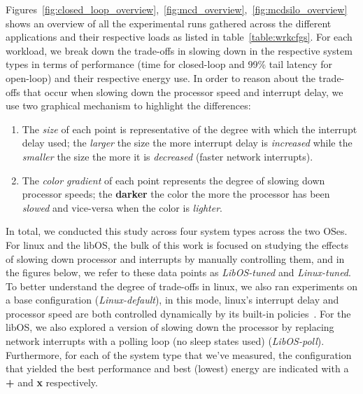\label{sec:exp}
Figures~\ref{fig:closed_loop_overview},~\ref{fig:mcd_overview},~\ref{fig:mcdsilo_overview} shows an overview of all the experimental runs gathered across the different applications and their respective loads as listed in table~\ref{table:wrkcfgs}. For each workload, we break down the trade-offs in slowing down in the respective system types in terms of performance (time for closed-loop and 99\% tail latency for open-loop) and their respective energy use. In order to reason about the trade-offs that occur when slowing down the processor speed and interrupt delay, we use two graphical mechanism to highlight the differences: 
\begin{enumerate}
    \item The \textit{size} of each point is representative of the degree with which the interrupt delay used; the {\larger[1]\textit{larger}} the size the more interrupt delay is \textit{increased} while the \textit{smaller} the size the more it is \textit{decreased} (faster network interrupts).
    \item The \textit{color gradient} of each point represents the degree of slowing down processor speeds; the \textbf{darker} the color the more the processor has been \textit{slowed} and vice-versa when the color is \textit{lighter}.
\end{enumerate}

In total, we conducted this study across four system types across the two OSes. For linux and the libOS, the bulk of this work is focused on studying the effects of slowing down processor and interrupts by manually controlling them, and in the figures below, we refer to these data points as \textit{LibOS-tuned} and \textit{Linux-tuned}. To better understand the degree of trade-offs in linux, we also ran experiments on a base configuration (\textit{Linux-default}), in this mode, linux's interrupt delay and processor speed are both controlled dynamically by its built-in policies~\cite{cpufreq_governor,intelitr}. For the libOS, we also explored a version of slowing down the processor by replacing network interrupts with a polling loop (no sleep states used) (\textit{LibOS-poll}). Furthermore, for each of the system type that we've measured, the configuration that yielded the best performance and best (lowest) energy are indicated with a {\larger[4]\textbf{+}} and {\larger[4]\textbf{x}} respectively.
